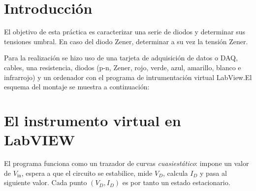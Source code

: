 \documentclass[10pt,a4paper]{article}
\begin{document}
\vfill
\begin{center}
  {\color{grisazul}}
\end{center}
\newpage

\section{Introducción}

\noindent
\begin{minipage}[c]{0.50\linewidth}
  El objetivo de esta práctica es caracterizar una serie de diodos y determinar sus tensiones umbral. En caso del diodo Zener, determinar a su vez la tensión Zener.
  \par\vspace{0.3cm}
  Para la realización se hizo uso de una tarjeta de adquisición de datos o DAQ, cables, una resistencia, diodos (p-n, Zener, rojo, verde, azul, amarillo, blanco e infrarrojo) y un ordenador con el programa de intrumentación virtual LabView.El esquema del montaje se muestra a continuación:
\end{minipage}\hfill
\begin{minipage}[c]{0.47\linewidth}\centering
  \label{fig:guiondiodos}
\end{minipage}

\section{El instrumento virtual en LabVIEW}

El programa funciona como un trazador de curvas \emph{cuasiestático}: impone un
valor de $V_{\text{in}}$, espera a que el circuito se estabilice, mide $V_D$,
calcula $I_D$ y pasa al siguiente valor. Cada punto $(V_D,I_D)$ es por tanto un
estado estacionario.
\end{document}
